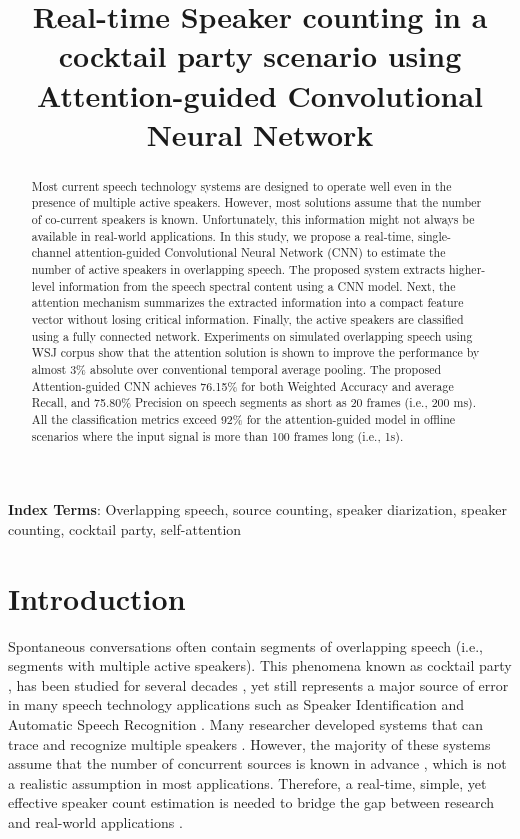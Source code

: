 \documentclass[a4paper]{article}
\title{Real-time Speaker counting in a cocktail party scenario using Attention-guided Convolutional Neural Network}
\begin{document}
\maketitle

\begin{abstract}

Most current speech technology systems are designed to operate well even in the presence of multiple active speakers. However, most solutions assume that the number of co-current speakers is known. Unfortunately, this information might not always be available in real-world applications. In this study, we propose a real-time, single-channel attention-guided Convolutional Neural Network (CNN) to estimate the number of active speakers in overlapping speech. The proposed system extracts higher-level information from the speech spectral content using a CNN model. Next, the attention mechanism summarizes the extracted information into a compact feature vector without losing critical information. Finally, the active speakers are classified using a fully connected network. Experiments on simulated overlapping speech using WSJ corpus show that the attention solution is shown to improve the performance  by almost 3\%  absolute over conventional temporal average pooling. The proposed Attention-guided CNN achieves 76.15\% for both Weighted Accuracy and average Recall, and 75.80\% Precision on speech segments as short as 20 frames (i.e., 200 ms).  All the classification metrics exceed 92\% for the attention-guided model in offline scenarios where the input signal is more than 100 frames long (i.e., 1s).  
\end{abstract}

\noindent\textbf{Index Terms}: Overlapping speech, source counting, speaker diarization, speaker counting, cocktail party, self-attention



\section{Introduction}
\label{sec:intro}

Spontaneous conversations often contain segments of overlapping speech (i.e., segments with multiple active speakers). This phenomena known as cocktail party \cite{cherry1953some,haykin2005cocktail, yousefi2018assessing}, has been studied for several decades \cite{bronkhorst2000cocktail,yousefi2020block, yousefi2016supervised}, yet still represents a major source of error in many speech technology applications such as Speaker Identification \cite{boakye2008overlapped,qian2018past,yousefi2020frame} and Automatic Speech Recognition \cite{manohar2019acoustic}. Many researcher developed systems that can trace and recognize multiple speakers \cite{qian2018past}. However, the majority of these systems assume that the number of concurrent sources is known in advance \cite{yu2017permutation,luo2018tasnet, yousefi2019probabilistic}, which is not a realistic assumption in most applications. Therefore, a real-time, simple, yet effective speaker count estimation is needed to bridge the gap between research and real-world applications \cite{von2019all}. 
\end{document}
